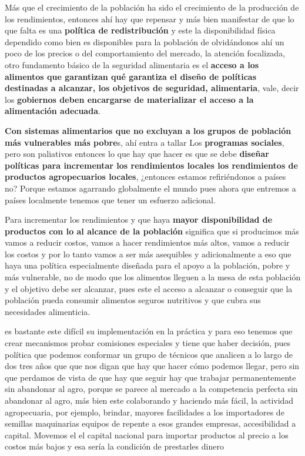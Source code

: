 \documentclass[
  letterpaper,
  DIV=11,
  numbers=noendperiod]{scrartcl}
\begin{document}
Más que el crecimiento de la población ha sido el crecimiento de la
producción de los rendimientos, entonces ahí hay que repensar y más bien
manifestar de que lo que falta es una \textbf{política de
redistribución} y este la disponibilidad física dependido como bien es
disponibles para la población de olvidándonos ahí un poco de los precios
o del comportamiento del mercado, la atención focalizada, otro
fundamento básico de la seguridad alimentaria es el \textbf{acceso a los
alimentos que garantizan qué garantiza el diseño de políticas destinadas
a alcanzar, los objetivos de seguridad, alimentaria}, vale, decir los
\textbf{gobiernos deben encargarse de materializar el acceso a la
alimentación adecuada}.

\textbf{Con sistemas alimentarios que no excluyan a los grupos de
población más vulnerables más pobre}s, ahí entra a tallar Los
\textbf{programas sociales}, pero son paliativos entonces lo que hay que
hacer es que se debe \textbf{diseñar políticas para incrementar los
rendimientos locales los rendimientos de productos agropecuarios
locales}, ¿entonces estamos refiriéndonos a países no? Porque estamos
agarrando globalmente el mundo pues ahora que entremos a países
localmente tenemos que tener un esfuerzo adicional.

Para incrementar los rendimientos y que haya \textbf{mayor
disponibilidad de productos con lo al alcance de la población} significa
que si producimos más vamos a reducir costos, vamos a hacer rendimientos
más altos, vamos a reducir los costos y por lo tanto vamos a ser más
asequibles y adicionalmente a eso que haya una política especialmente
diseñada para el apoyo a la población, pobre y más vulnerable, no de
modo que los alimentos lleguen a la mesa de esta población y el objetivo
debe ser alcanzar, pues este el acceso a alcanzar o conseguir que la
población pueda consumir alimentos seguros nutritivos y que cubra sus
necesidades alimenticia.

es bastante este difícil su implementación en la práctica y para eso
tenemos que crear mecanismos probar comisiones especiales y tiene que
haber decisión, pues política que podemos conformar un grupo de técnicos
que analicen a lo largo de dos tres años que que nos digan que hay que
hacer cómo podemos llegar, pero sin que perdamos de vista de que hay que
seguir hay que trabajar permanentemente sin abandonar al agro, porque se
parece al mercado a la competencia perfecta sin abandonar al agro, más
bien este colaborando y haciendo más fácil, la actividad agropecuaria,
por ejemplo, brindar, mayores facilidades a los importadores de semillas
maquinarias equipos de repente a esos grandes empresas, accesibilidad a
capital. Movemos el el capital nacional para importar productos al
precio a los costos más bajos y esa sería la condición de prestarles
dinero
\end{document}
